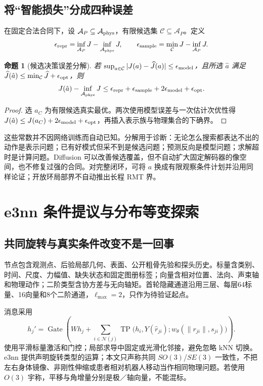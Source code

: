 \documentclass[UTF8,fontset=fandol,11pt,a4paper]{ctexart}
\theoremstyle{plain}
\newtheorem{proposition}[theorem]{命题}
\theoremstyle{definition}
\theoremstyle{remark}
\numberwithin{equation}{section}
\begin{document}
\subsection{将“智能损失”分成四种误差}
在固定合法合同下，设 $\mathcal A_P\subseteq\mathcal A_{\rm phys}$，有限候选集 $\mathcal C\subseteq\mathcal A_P$。定义
\begin{equation}
\epsilon_{\rm repr}=\inf_{\mathcal A_P}J-\inf_{\mathcal A_{\rm phys}}J,
\qquad
\epsilon_{\rm sample}=\min_{\mathcal C}J-\inf_{\mathcal A_P}J.
\end{equation}
\begin{proposition}[候选决策误差分解]
若 $\sup_{a\in\mathcal C}|J(a)-\widehat J(a)|\le\epsilon_{
\rm model}$，且所选 $\hat a$ 满足 $\widehat J(\hat a)\le\min_{\mathcal C}\widehat J+\epsilon_{\rm opt}$，则
\begin{equation}
J(\hat a)-\inf_{\mathcal A_{\rm phys}}J
\le\epsilon_{\rm repr}+\epsilon_{\rm sample}+2\epsilon_{\rm model}+\epsilon_{\rm opt}.
\label{eq:decomposition}
\end{equation}
\end{proposition}
\begin{proof}
选 $a_C$ 为有限候选真实最优。两次使用模型误差与一次估计次优性得 $J(\hat a)\le J(a_C)+2\epsilon_{\rm model}+\epsilon_{\rm opt}$，再插入表示族与物理集合的下确界。
\end{proof}

这些常数并不因网络训练而自动已知。分解用于诊断：无论怎么搜索都表达不出的动作是表示问题；已有好模式但采不到是候选问题；预测反向是模型问题；求解超时是计算问题。Diffusion 可以改善候选覆盖，但不自动扩大固定解码器的像空间，也不修复过强的合同。对完整闭环，可将 $a$ 换成有限观察条件计划并沿用同样论证；开放环局部界不自动推出长程 RMT 界。

\section{e3nn 条件提议与分布等变探索}
\label{sec:equivariance}
\subsection{共同旋转与真实条件改变不是一回事}
节点包含观测点、后验局部几何、表面、公开粗骨先验和探头历史。标量含类别、时间、尺度、力幅值、缺失状态和固定图册标签；向量含相对位置、法向、声束轴和物理动作；二阶类型含协方差与无向轴矩。首轮隐藏通道沿用三层、每层64标量、16向量和8个二阶通道，$\ell_{\max}=2$，只作为待验证起点。

消息采用
\begin{equation}
h_j'=\operatorname{Gate}\!\left(Wh_j+\sum_{i\in\mathcal N(j)}
\operatorname{TP}\big(h_i,Y(\widehat r_{ji});w_\theta(\|r_{ji}\|,s_{ji})\big)\right).
\end{equation}
使用平滑标量激活和门控；局部求导中固定或光滑化邻接，避免忽略 kNN 切换。e3nn 提供声明旋转类型的运算\cite{e3nn,e3nndocs}；本文只声称共同 $SO(3)$/$SE(3)$ 一致性，不把左右身体镜像、非刚性伸缩或患者相对机器人移动当作相同物理问题。若使用 $O(3)$ 宇称，平移与角增量分别是极／轴向量，不能混标。
\end{document}
